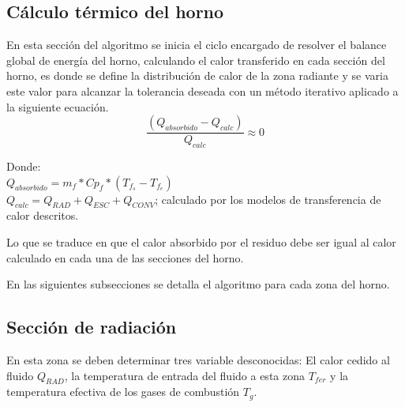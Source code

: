 \subsection{Cálculo térmico del horno}
\par En esta sección del algoritmo se inicia el ciclo encargado de resolver el balance global de energía del horno, calculando el calor transferido en cada sección del horno, es donde se define la distribución de calor de la zona radiante y se varia este valor para alcanzar la tolerancia deseada con un método iterativo aplicado a la siguiente ecuación.
\begin{equation}
\label{eq:ciclo_externo}
\frac{(Q_{absorbido} - Q_{calc})}{Q_{calc}} \approx 0
\end{equation}
\par Donde:\\
$Q_{absorbido} = m_{f} * Cp_{f} * (T_{f_s}-T_{f_e})$ \\
$Q_{calc} = Q_{RAD} + Q_{ESC} + Q_{CONV}$; calculado por los modelos de transferencia de calor descritos.
\par Lo que se traduce en que el calor absorbido por el residuo debe ser igual al calor calculado en cada una de las secciones del horno.
\par En las siguientes subsecciones se detalla el algoritmo para cada zona del horno.

\subsection{Sección de radiación}
\par En esta zona se deben determinar tres variable desconocidas: El calor cedido al fluido $Q_{RAD}$, la temperatura de entrada del fluido a esta zona $T_{fer}$ y la temperatura efectiva de los gases de combustión $T_g$.

